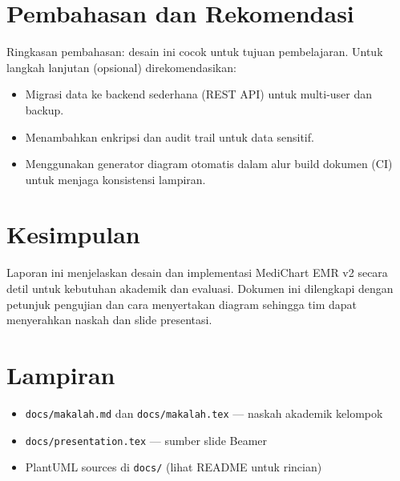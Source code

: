 \documentclass[12pt,a4paper]{article}
\begin{document}
\section{Pembahasan dan Rekomendasi}
Ringkasan pembahasan: desain ini cocok untuk tujuan pembelajaran. Untuk langkah lanjutan (opsional) direkomendasikan:
\begin{itemize}[leftmargin=1.2cm]
  \item Migrasi data ke backend sederhana (REST API) untuk multi-user dan backup.
  \item Menambahkan enkripsi dan audit trail untuk data sensitif.
  \item Menggunakan generator diagram otomatis dalam alur build dokumen (CI) untuk menjaga konsistensi lampiran.
\end{itemize}

\section{Kesimpulan}
Laporan ini menjelaskan desain dan implementasi MediChart EMR v2 secara detil untuk kebutuhan akademik dan evaluasi. Dokumen ini dilengkapi dengan petunjuk pengujian dan cara menyertakan diagram sehingga tim dapat menyerahkan naskah dan slide presentasi.

\section*{Lampiran}
\begin{itemize}[leftmargin=1.2cm]
  \item \texttt{docs/makalah.md} dan \texttt{docs/makalah.tex} — naskah akademik kelompok
  \item \texttt{docs/presentation.tex} — sumber slide Beamer
  \item PlantUML sources di \texttt{docs/} (lihat README untuk rincian)
\end{itemize}
\end{document}
